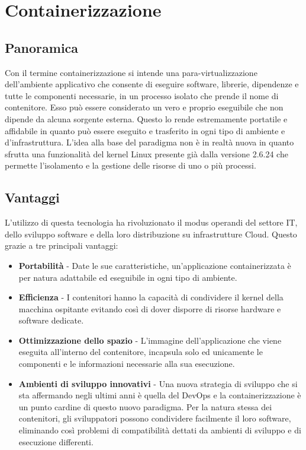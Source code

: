 
\section{Containerizzazione}

\subsection{Panoramica}
Con il termine containerizzazione si intende una para-virtualizzazione dell'ambiente applicativo che consente di eseguire software, librerie, dipendenze e tutte le componenti necessarie, in un processo isolato che prende il nome di contenitore. Esso può essere considerato un vero e proprio eseguibile che non dipende da alcuna sorgente esterna. Questo lo rende estremamente portatile e affidabile in quanto può essere eseguito e trasferito in ogni tipo di ambiente e d'infrastruttura.
L'idea alla base del paradigma non è in realtà nuova in quanto sfrutta una funzionalità del kernel Linux presente già dalla versione 2.6.24 che permette l'isolamento e la gestione delle risorse di uno o più processi.

\subsection{Vantaggi}
L'utilizzo di questa tecnologia ha rivoluzionato il modus operandi del settore IT, dello sviluppo software e della loro distribuzione su infrastrutture Cloud. Questo grazie a tre principali vantaggi:
\begin{itemize}
\item \textbf{Portabilità} - Date le sue caratteristiche, un'applicazione containerizzata è per natura adattabile ed eseguibile in ogni tipo di ambiente. 
\item \textbf{Efficienza} - I contenitori hanno la capacità di condividere il kernel della macchina ospitante evitando così di dover disporre di risorse hardware e software dedicate.
\item \textbf{Ottimizzazione dello spazio} - L'immagine dell'applicazione che viene eseguita all'interno del contenitore, incapsula solo ed unicamente le componenti e le informazioni necessarie alla sua esecuzione.
\item \textbf{Ambienti di sviluppo innovativi} - Una nuova strategia di sviluppo che si sta affermando negli ultimi anni è quella del DevOps e la containerizzazione è un punto cardine di questo nuovo paradigma. Per la natura stessa dei contenitori, gli sviluppatori possono condividere facilmente il loro software, eliminando così problemi di compatibilità dettati da ambienti di sviluppo e di esecuzione differenti. 
\end{itemize}

